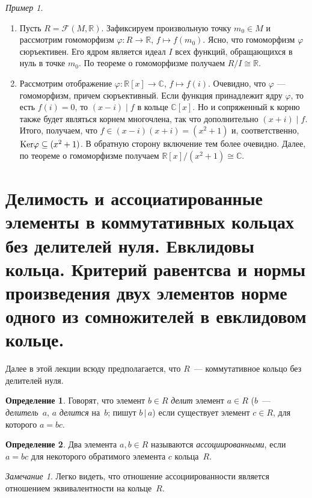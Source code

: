 \documentclass[a4paper, 12pt]{article}
\def\Ker{{\rm Ker}}%
\def\CC{{\mathbb C}}%
\def\RR{{\mathbb R}}%
\def\FFF{\mathcal{F}}
\theoremstyle{definition}
\newtheorem{definition}{Определение}
\theoremstyle{remark}
\newtheorem{remark}{Замечание}
\newtheorem{example}{Пример}
\begin{document}
\begin{example}\ 
\begin{enumerate}
\item Пусть $R = \FFF(M, \RR)$. Зафиксируем произвольную точку $m_0 \in M$
и рассмотрим гомоморфизм $\varphi \colon R \to \RR$, $f \mapsto
f(m_0)$. Ясно, что гомоморфизм $\varphi$ сюръективен. Его ядром
является идеал $I$ всех функций, обращающихся в нуль в точке $m_0$.
По теореме о гомоморфизме получаем $R / I \cong \RR$.
\item Рассмотрим отображение $\varphi \colon \RR[x] \to \CC$, $f \mapsto f(i)$. Очевидно, что $\varphi$ --- гомоморфизм, причем сюръективный. Если функция принадлежит ядру $\varphi$, то есть $f(i) = 0$, то $(x - i) \mid f$ в кольце $\CC[x]$. Но и сопряженный к корню также будет являться корнем многочлена, так что дополнительно $(x + i) \mid f$. Итого, получаем, что $f \in (x - i)(x + i) = (x^2 + 1)$ и, соответственно, $\Ker \varphi  \subseteq (x^2 + 1)$. В обратную сторону включение тем более очевидно. Далее, по теореме о гомоморфизме получаем $\RR[x] / (x^2 + 1) \cong \CC$.
\end{enumerate}
\end{example}


\section{Делимость и ассоциатированные элементы в коммутативных кольцах без делителей нуля. Евклидовы кольца. Критерий равентсва и нормы произведения двух элементов норме одного из сомножителей в евклидовом кольце.}

Далее в этой лекции всюду предполагается, что $R$~--- коммутативное кольцо
без делителей нуля.

\begin{definition}
Говорят, что элемент $b \in R$ {\it делит} элемент $a\in R$ ($b$~---
\textit{делитель}~$a$, $a$ \textit{делится} на~$b$; пишут $b \,|\,
a$) если существует элемент $c\in R$, для которого $a=bc$.
\end{definition}

\begin{definition}
Два элемента $a, b \in R$ называются {\it ассоциированными}, если
$a=bc$ для некоторого обратимого элемента $c$ кольца~$R$.
\end{definition}

\begin{remark}
Легко видеть, что отношение ассоциированности является отношением
эквивалентности на кольце~$R$.
\end{remark}
\end{document}
